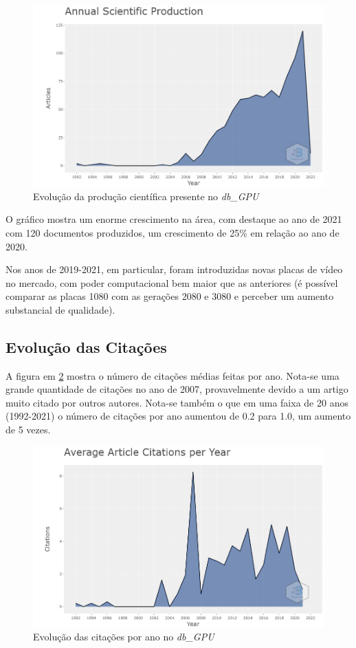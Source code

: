 \begin{figure}[ht]
    \centering
    \includegraphics[width=12cm]{experiments/gustavo-tomas/AnaliseBibliometrica/GPUs/Graficos/gpu-prod-cient.png}
    \caption{Evolução da produção científica presente no \textit{db\_GPU}}
    \label{fig:gpu-prod-cient}
\end{figure}

O gráfico mostra um enorme crescimento na área, com destaque ao ano de 2021 com 120 documentos produzidos, um crescimento de 25\% em relação ao ano de 2020.

Nos anos de 2019-2021, em particular, foram introduzidas novas placas de vídeo no mercado, com poder computacional bem maior que as anteriores (é possível comparar as placas 1080 com as gerações 2080 e 3080 e perceber um aumento substancial de qualidade).

\subsection{Evolução das Citações}

A figura em \ref{fig:gpu-citation-year} mostra o número de citações médias feitas por ano. Nota-se uma grande quantidade de citações no ano de 2007, provavelmente devido a um artigo muito citado por outros autores. Nota-se também o que em uma faixa de 20 anos (1992-2021) o número de citações por ano aumentou de 0.2 para 1.0, um aumento de 5 vezes.

\begin{figure}[ht]
    \centering
    \includegraphics[width=12cm]{experiments/gustavo-tomas/AnaliseBibliometrica/GPUs/Graficos/gpu-citation-year.png}
    \caption{Evolução das citações por ano no \textit{db\_GPU}}
    \label{fig:gpu-citation-year}
\end{figure}

